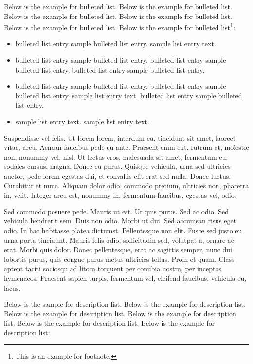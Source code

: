\documentclass[CJCE,STIX2COL]{WileyNJD-v2}
\begin{document}
Below is the example for bulleted list. Below is the example for bulleted list. Below is the example for bulleted list. Below is the example for bulleted list. Below is the example for bulleted list. Below is the example for bulleted list\footnote{This is an example for footnote.}:
\begin{itemize}
\item bulleted list entry sample bulleted list entry. sample list entry text. 
\item bulleted list entry sample bulleted list entry. bulleted list entry sample bulleted list entry. bulleted list entry sample bulleted list entry.
\item bulleted list entry sample bulleted list entry. bulleted list entry sample bulleted list entry. sample list entry text.  bulleted list entry sample bulleted list entry.
\item sample list entry text. sample list entry text.  
\end{itemize}

Suspendisse vel felis. Ut lorem lorem, interdum eu, tincidunt sit amet, laoreet vitae, arcu. Aenean faucibus pede eu
ante. Praesent enim elit, rutrum at, molestie non, nonummy vel, nisl. Ut lectus eros, malesuada sit amet, fermentum
eu, sodales cursus, magna. Donec eu purus. Quisque vehicula, urna sed ultricies auctor, pede lorem egestas dui, et
convallis elit erat sed nulla. Donec luctus. Curabitur et nunc. Aliquam dolor odio, commodo pretium, ultricies non,
pharetra in, velit. Integer arcu est, nonummy in, fermentum faucibus, egestas vel, odio.

Sed commodo posuere pede. Mauris ut est. Ut quis purus. Sed ac odio. Sed vehicula hendrerit sem. Duis non
odio. Morbi ut dui. Sed accumsan risus eget odio. In hac habitasse platea dictumst. Pellentesque non elit. Fusce
sed justo eu urna porta tincidunt. Mauris felis odio, sollicitudin sed, volutpat a, ornare ac, erat. Morbi quis dolor. Donec pellentesque, erat ac sagittis semper, nunc dui lobortis purus, quis congue purus metus ultricies tellus. Proin
et quam. Class aptent taciti sociosqu ad litora torquent per conubia nostra, per inceptos hymenaeos. Praesent sapien
turpis, fermentum vel, eleifend faucibus, vehicula eu, lacus.

Below is the sample for description list. Below is the example for description list. Below is the example for description list. Below is the example for description list. Below is the example for description list. Below is the example for description list:\\[12pt]
\end{document}
